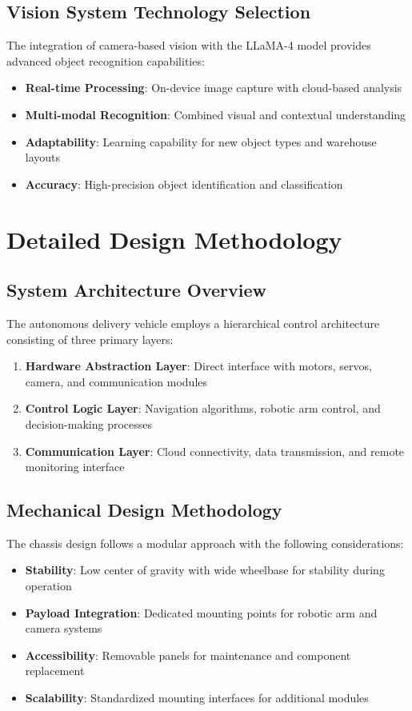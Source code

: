 \subsection{Vision System Technology Selection}
The integration of camera-based vision with the LLaMA-4 model provides advanced object recognition capabilities:
\begin{itemize}
\item \textbf{Real-time Processing}: On-device image capture with cloud-based analysis
\item \textbf{Multi-modal Recognition}: Combined visual and contextual understanding
\item \textbf{Adaptability}: Learning capability for new object types and warehouse layouts
\item \textbf{Accuracy}: High-precision object identification and classification
\end{itemize}

\section{Detailed Design Methodology}

\subsection{System Architecture Overview}
The autonomous delivery vehicle employs a hierarchical control architecture consisting of three primary layers:

\begin{enumerate}
\item \textbf{Hardware Abstraction Layer}: Direct interface with motors, servos, camera, and communication modules
\item \textbf{Control Logic Layer}: Navigation algorithms, robotic arm control, and decision-making processes
\item \textbf{Communication Layer}: Cloud connectivity, data transmission, and remote monitoring interface
\end{enumerate}

\subsection{Mechanical Design Methodology}
The chassis design follows a modular approach with the following considerations:

\begin{itemize}
\item \textbf{Stability}: Low center of gravity with wide wheelbase for stability during operation
\item \textbf{Payload Integration}: Dedicated mounting points for robotic arm and camera systems
\item \textbf{Accessibility}: Removable panels for maintenance and component replacement
\item \textbf{Scalability}: Standardized mounting interfaces for additional modules
\end{itemize}

